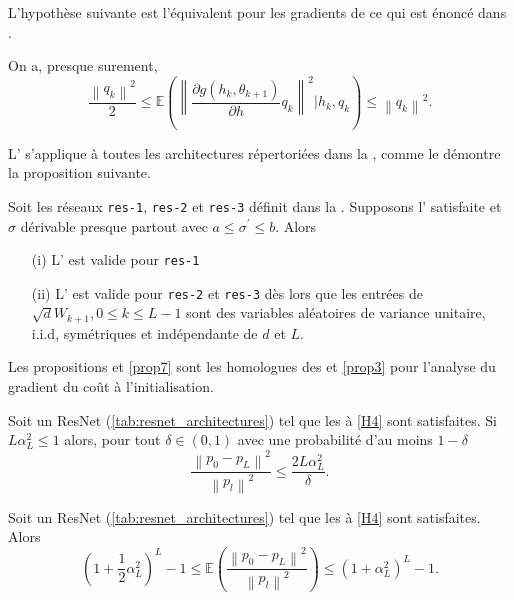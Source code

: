 L'hypothèse suivante est l'équivalent pour les gradients de ce qui est énoncé dans .
\begin{assumption}\label{H4}
    On a, presque surement, 
    \[
        \frac{\left\| q_k \right\| ^2}{2} \leqslant \mathbb{E}\left(\left\| \frac{\partial g(h_k, \theta _{k+1})}{\partial h} q_k  \right\| ^2 | h_k, q_k \right) \leqslant \left\| q_k \right\| ^2
    .\]
\end{assumption}

L' s'applique à toutes les architectures répertoriées dans la , comme le démontre la proposition suivante.
\begin{proposition}\label{prop5}
    Soit les réseaux \texttt{res-1}, \texttt{res-2} et \texttt{res-3} définit dans la . Supposons l' satisfaite et $ \sigma  $ dérivable presque partout avec $ a \leqslant \sigma ^\prime \leqslant b $. Alors
    \begin{itemize}
        \item [(i)] L' est valide pour \texttt{res-1}
        \item [(ii)] L' est valide pour \texttt{res-2} et \texttt{res-3} dès lors que les entrées de $ \sqrt{d} W_{k+1}, 0 \leqslant k \leqslant L-1 $ sont des variables aléatoires de variance unitaire, i.i.d, symétriques et indépendante de $ d $ et $ L $.
    \end{itemize}
\end{proposition}

Les propositions  et \ref{prop7} sont les homologues des  et \ref{prop3} pour l'analyse du gradient du coût à l'initialisation.

\begin{proposition}\label{prop6}
    Soit un ResNet (\ref{tab:resnet_architectures}) tel que les  à \ref{H4} sont satisfaites. Si $ L \alpha _L ^2 \leqslant 1 $ alors, pour tout $ \delta \in (0,1) $ avec une probabilité d'au moins $ 1 - \delta  $ 
    \[
        \frac{\left\| p_0 - p_L \right\| ^2 }{\left\| p_l \right\| ^2 } \leqslant \frac{2 L \alpha _L ^2}{\delta }
    .\]
\end{proposition}

\begin{proposition}\label{prop7}
    Soit un ResNet (\ref{tab:resnet_architectures}) tel que les  à \ref{H4} sont satisfaites. Alors 
    \[
        (1 + \frac{1}{2} \alpha _L ^2)^L - 1 \leqslant \mathbb{E}\left( \frac{\left\| p_0 - p_L \right\| ^2 }{\left\| p_l \right\| ^2 } \right) \leqslant (1 + \alpha _L ^2)^L - 1
    .\]
\end{proposition}


